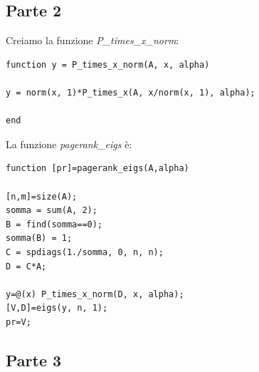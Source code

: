 \documentclass[11pt,a4paper,twoside,openright,titlepage,
                           headinclude,footinclude,BCOR5mm,
                           numbers=noenddot,cleardoublepage=empty,
                           tablecaptionabove]{scrbook}
\begin{document}
\subsection{\textbf{Parte 2}}
Creiamo la funzione \emph{P\_times\_x\_norm}:
\begin{lstlisting}[frame=trBL]
function y = P_times_x_norm(A, x, alpha)

y = norm(x, 1)*P_times_x(A, x/norm(x, 1), alpha);

end
\end{lstlisting}
La funzione \emph{pagerank\_eigs} è:
\begin{lstlisting}[frame=trBL]
function [pr]=pagerank_eigs(A,alpha)

[n,m]=size(A);
somma = sum(A, 2);
B = find(somma==0);
somma(B) = 1;
C = spdiags(1./somma, 0, n, n);
D = C*A;

y=@(x) P_times_x_norm(D, x, alpha);
[V,D]=eigs(y, n, 1);
pr=V;

\end{lstlisting}

\subsection{\textbf{Parte 3}}
\end{document}
